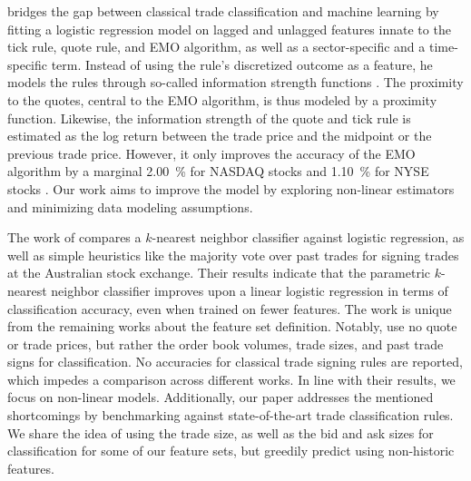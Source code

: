 \textcite[\checkmark][396--398]{rosenthalModelingTradeDirection2012} bridges the gap between classical trade classification and machine learning by fitting a logistic regression model on lagged and unlagged features innate to the tick rule, quote rule, and \gls{EMO} algorithm, as well as a sector-specific and a time-specific term. Instead of using the rule's discretized outcome as a feature, he models the rules through so-called information strength functions \autocite[\checkmark][396--398]{rosenthalModelingTradeDirection2012}. The proximity to the quotes, central to the \gls{EMO} algorithm, is thus modeled by a proximity function. Likewise, the information strength of the quote and tick rule is estimated as the log return between the trade price and the midpoint or the previous trade price. However, it only improves the accuracy of the \gls{EMO} algorithm by a marginal \SI{2.00}{\percent} for \gls{NASDAQ} stocks and \SI{1.10}{\percent} for \gls{NYSE} stocks \autocite[\checkmark][405]{rosenthalModelingTradeDirection2012}. Our work aims to improve the model by exploring non-linear estimators and minimizing data modeling assumptions.

The work of \textcite[\checkmark][483]{blazejewskiLocalNonParametricModel2005} compares a $k$-nearest neighbor classifier against logistic regression, as well as simple heuristics like the majority vote over past trades for signing trades at the Australian stock exchange. Their results indicate that the parametric $k$-nearest neighbor classifier improves upon a linear logistic regression in terms of classification accuracy, even when trained on fewer features. The work is unique from the remaining works about the feature set definition. Notably, \textcite[\checkmark][483]{blazejewskiLocalNonParametricModel2005} use no quote or trade prices, but rather the order book volumes, trade sizes, and past trade signs for classification. No accuracies for classical trade signing rules are reported, which impedes a comparison across different works. In line with their results, we focus on non-linear models. Additionally, our paper addresses the mentioned shortcomings by benchmarking against state-of-the-art trade classification rules. We share the idea of using the trade size, as well as the bid and ask sizes for classification for some of our feature sets, but greedily predict using non-historic features.


